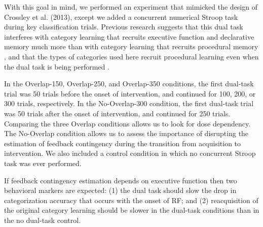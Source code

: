 \documentclass[apacite,draftfirst,jou]{apa6}
\begin{document}

With this goal in mind, we performed an experiment that mimicked the design of
Crossley et al. (2013), except we added a concurrent numerical Stroop task
during key classification trials. Previous research suggests that this dual task
interferes with category learning that recruits executive function and
declarative memory much more than with category learning that recruits
procedural memory \cite{WaldronAshby2001, crossley2016declarative}, and that the
types of categories used here recruit procedural learning even when the dual
task is being performed \cite{crossley2016declarative}.

In the Overlap-150, Overlap-250, and Overlap-350 conditions, the first dual-task
trial was 50 trials before the onset of intervention, and continued for 100,
200, or 300 trials, respectively. In the No-Overlap-300 condition, the first
dual-task trial was 50 trials after the onset of intervention, and continued for
250 trials. Comparing the three Overlap conditions allows us to look for dose
dependency. The No-Overlap condition allows us to assess the importance of
disrupting the estimation of feedback contingency during the transition from
acquisition to intervention. We also included a control condition in which no
concurrent Stroop task was ever performed.


If feedback contingency estimation depends on executive function then two
behavioral markers are expected: (1) the dual task should slow the drop in
categorization accuracy that occurs with the onset of RF; and (2) reacquisition
of the original category learning should be slower in the dual-task conditions
than in the no dual-task control.
\end{document}
